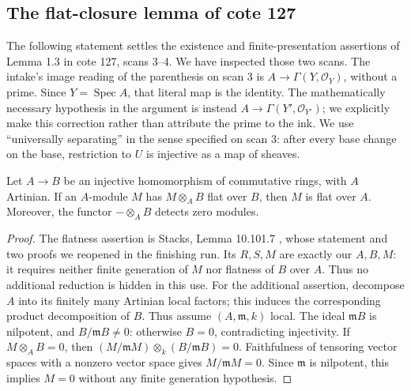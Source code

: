 \subsection{The flat-closure lemma of cote 127}

The following statement settles the existence and finite-presentation assertions
of Lemma 1.3 in cote 127, scans 3--4.  We have inspected those two scans.
The intake's image reading of the parenthesis on scan 3 is
$A\longrightarrow\Gamma(Y,\mathcal O_Y)$, without a prime.  Since
$Y=\operatorname{Spec}A$, that literal map is the identity.  The
mathematically necessary hypothesis in the argument is instead
$A\longrightarrow\Gamma(Y',\mathcal O_{Y'})$; we explicitly make this
correction rather than attribute the prime to the ink.
We use ``universally separating'' in the sense specified on scan 3: after every
base change on the base, restriction to $U$ is injective as a map of sheaves.

\begin{lemma}\label{A4:artinianflat}
Let $A\to B$ be an injective homomorphism of commutative rings, with $A$
Artinian.  If an $A$-module $M$ has $M\otimes_A B$ flat over $B$, then $M$
is flat over $A$.  Moreover, the functor $-\otimes_A B$ detects zero modules.
\end{lemma}
\begin{proof}
The flatness assertion is Stacks, Lemma 10.101.7
\cite[Tag 051E, Lemma 10.101.7]{StacksArtinian}, whose statement and two
proofs we reopened in the finishing run.  Its $R,S,M$ are exactly our
$A,B,M$: it requires neither finite generation of $M$ nor flatness of
$B$ over $A$.  Thus no additional reduction is hidden in this use.
For the additional assertion, decompose $A$ into its finitely many Artinian
local factors; this induces the corresponding product decomposition of $B$.
Thus assume $(A,\mathfrak m,k)$ local.  The ideal $\mathfrak mB$ is nilpotent,
and $B/\mathfrak mB\ne0$: otherwise $B=0$, contradicting injectivity.
If $M\otimes_A B=0$, then
$(M/\mathfrak mM)\otimes_k(B/\mathfrak mB)=0$.  Faithfulness of tensoring
vector spaces with a nonzero vector space gives $M/\mathfrak mM=0$.
Since $\mathfrak m$ is nilpotent, this implies $M=0$ without any finite
generation hypothesis.
\end{proof}

